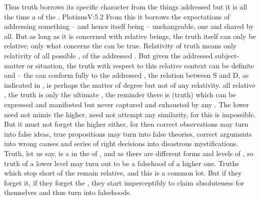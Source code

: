 Thus truth borrows its specific character from the things addressed but it is
all the time a  of the .  \citet{Thus
  veritable truth is not accordance with an external; it is self-accordance; it
  affirms and is nothing other than itself and is nothing other; it is at once
  existence and self-affirmation.}{Plotinus}{V:5.2} From this  it borrows the expectations of addressing something -- and hence
itself being -- unchangeable, one and shared by all.  But as long as it is
concerned with relative beings, the truth itself can only be relative; only what
concerns the  can be  true.
%
Relativity of truth means only relativity of all possible , of the
addressed 
. But given the addressed subject-matter or situation, the truth
with respect to this relative context can be definite and  -- the
 can conform fully to the addressed , the
relation between S and D, as indicated in , is perhaps the
matter of degree but not of any relativity.  all relative , 
the  truth is only the ultimate , the reminder 
there is (truth) which can be expressed and manifested but never captured and
exhausted by any .  The lower need not mimic the higher, need not
attempt any similarity, for this is impossible. But it must not forget the
higher either, for then correct observations may turn into false ideas, true
propositions may turn into false theories, correct arguments into wrong causes
and series of right decisions into disastrous mystifications. Truth, let us say,
is a  in the  of , and
as there are different forms and levels of , so truth of a
lower level may turn out to be a falsehood of a higher one.  Truths which stop
short of the  remain relative, and this is a common lot. But if
they forget it, if they forget the , they start imperceptibly to
claim absoluteness for themselves and thus turn into falsehoods.  




